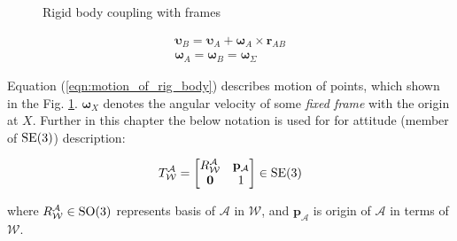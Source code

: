 \begin{figure}[H]
    \caption{Rigid body coupling with frames}
    \label{fig:coupling_rigid_body}
\end{figure}

\begin{equation}
    \begin{aligned}
        \boldsymbol{\upsilon}_B = \boldsymbol{\upsilon}_A + 
        \boldsymbol{\omega}_A \times \mathbf{r}_{AB} \\
        \boldsymbol{\omega}_A = \boldsymbol{\omega}_B 
        = \boldsymbol{\omega}_{\Sigma}
    \end{aligned}
    \label{eqn:motion_of_rig_body}
\end{equation}

Equation (\ref{eqn:motion_of_rig_body}) describes motion of points, which 
shown in the Fig. {\ref{fig:coupling_rigid_body}}. $\boldsymbol{\omega}_X$ 
denotes the angular velocity of some \emph{fixed frame} with the origin at $X$.
Further in this chapter the below notation is used for for attitude (member of $\text{SE}(3)$) 
description:

\begin{equation}
    T_{\mathcal{W}}^{\mathcal{A}} = 
    \begin{bmatrix}
        R^{\mathcal{A}}_{\mathcal{W}} & \mathbf{p}_{\mathcal{A}} \\
        \mathbf{0} & 1
    \end{bmatrix}
    \in \text{SE}(3)
    \label{eqn:se_3_element}
\end{equation}

where $R^{\mathcal{A}}_{\mathcal{W}} \in \text{SO}(3)$ represents basis of $\mathcal{A}$ 
in $\mathcal{W}$, and $\mathbf{p}_{\mathcal{A}}$ is origin of $\mathcal{A}$ in 
terms of $\mathcal{W}$.

